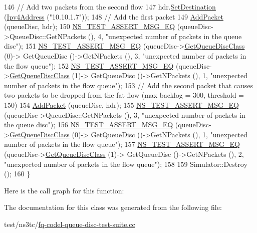 \begin{DoxyCode}
146   \textcolor{comment}{// Add two packets from the second flow}
147   hdr.\hyperlink{classns3_1_1Ipv4Header_a154e584fb5418de7a5ce34dbb852de02}{SetDestination} (\hyperlink{classns3_1_1Ipv4Address}{Ipv4Address} (\textcolor{stringliteral}{"10.10.1.7"}));
148   \textcolor{comment}{// Add the first packet}
149   \hyperlink{classFqCoDelQueueDiscIPFlowsSeparationAndPacketLimit_abcc442c698eb2bcd3b6cafe34d751297}{AddPacket} (queueDisc, hdr);
150   \hyperlink{group__testing_ga2a9d78cffb3db8e867c35fff0b698cf5}{NS\_TEST\_ASSERT\_MSG\_EQ} (queueDisc->QueueDisc::GetNPackets (), 4, \textcolor{stringliteral}{"unexpected number
       of packets in the queue disc"});
151   \hyperlink{group__testing_ga2a9d78cffb3db8e867c35fff0b698cf5}{NS\_TEST\_ASSERT\_MSG\_EQ} (queueDisc->\hyperlink{classns3_1_1QueueDisc_a584d228f7bff3f754d32793a38134556}{GetQueueDiscClass} (0)->
      GetQueueDisc ()->GetNPackets (), 3, \textcolor{stringliteral}{"unexpected number of packets in the flow queue"});
152   \hyperlink{group__testing_ga2a9d78cffb3db8e867c35fff0b698cf5}{NS\_TEST\_ASSERT\_MSG\_EQ} (queueDisc->\hyperlink{classns3_1_1QueueDisc_a584d228f7bff3f754d32793a38134556}{GetQueueDiscClass} (1)->
      GetQueueDisc ()->GetNPackets (), 1, \textcolor{stringliteral}{"unexpected number of packets in the flow queue"});
153   \textcolor{comment}{// Add the second packet that causes two packets to be dropped from the fat flow (max backlog = 300,
       threshold = 150)}
154   \hyperlink{classFqCoDelQueueDiscIPFlowsSeparationAndPacketLimit_abcc442c698eb2bcd3b6cafe34d751297}{AddPacket} (queueDisc, hdr);
155   \hyperlink{group__testing_ga2a9d78cffb3db8e867c35fff0b698cf5}{NS\_TEST\_ASSERT\_MSG\_EQ} (queueDisc->QueueDisc::GetNPackets (), 3, \textcolor{stringliteral}{"unexpected number
       of packets in the queue disc"});
156   \hyperlink{group__testing_ga2a9d78cffb3db8e867c35fff0b698cf5}{NS\_TEST\_ASSERT\_MSG\_EQ} (queueDisc->\hyperlink{classns3_1_1QueueDisc_a584d228f7bff3f754d32793a38134556}{GetQueueDiscClass} (0)->
      GetQueueDisc ()->GetNPackets (), 1, \textcolor{stringliteral}{"unexpected number of packets in the flow queue"});
157   \hyperlink{group__testing_ga2a9d78cffb3db8e867c35fff0b698cf5}{NS\_TEST\_ASSERT\_MSG\_EQ} (queueDisc->\hyperlink{classns3_1_1QueueDisc_a584d228f7bff3f754d32793a38134556}{GetQueueDiscClass} (1)->
      GetQueueDisc ()->GetNPackets (), 2, \textcolor{stringliteral}{"unexpected number of packets in the flow queue"});
158 
159   Simulator::Destroy ();
160 \}
\end{DoxyCode}


Here is the call graph for this function\+:




The documentation for this class was generated from the following file\+:\begin{DoxyCompactItemize}
\item 
test/ns3tc/\hyperlink{fq-codel-queue-disc-test-suite_8cc}{fq-\/codel-\/queue-\/disc-\/test-\/suite.\+cc}\end{DoxyCompactItemize}

